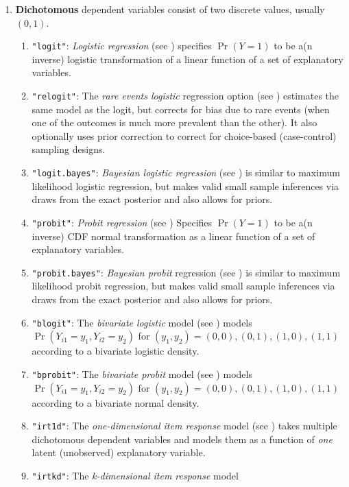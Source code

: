 \begin{enumerate}
\begin{enumerate}
   \end{enumerate}
 \item {\bf Dichotomous} dependent variables consist of two discrete
values, usually $(0,1)$.  
   \begin{enumerate}
   \item {\tt "logit"}: {\it Logistic regression} (see )
     specifies $\Pr(Y=1)$ to be a(n inverse) logistic transformation
     of a linear function of a set of explanatory variables.
   \item {\tt "relogit"}: The {\it rare events logistic} regression
     option (see ) estimates the same model as the
     logit, but corrects for bias due to rare events (when one of the
     outcomes is much more prevalent than the other).  It also
     optionally uses prior correction to correct for choice-based
     (case-control) sampling designs.
   \item {\tt "logit.bayes"}: {\it Bayesian logistic regression} (see
) is similar to maximum likelihood logistic
regression, but makes valid small sample inferences via draws from the
exact posterior and also allows for priors.  
   \item {\tt "probit"}: {\it Probit regression} (see )
     Specifies $\Pr(Y=1)$ to be a(n inverse) CDF normal transformation
     as a linear function of a set of explanatory variables.
   \item {\tt "probit.bayes"}: {\it Bayesian probit} regression (see
) is similar to maximum likelihood probit
regression, but makes valid small sample inferences via draws from the
exact posterior and also allows for priors. 
   \item {\tt "blogit"}: The {\it bivariate logistic} model (see
     ) models $\Pr(Y_{i1} = y_1, Y_{i2} = y_2)$ for
$(y_1, y_2) = {(0,0), (0,1), (1,0), (1,1)}$ according 
to a bivariate logistic density.
   \item {\tt "bprobit"}: The {\it bivariate probit} model (see
     ) models $\Pr(Y_{i1} = y_1, Y_{i2} = y_2)$ for
$(y_1, y_2) = {(0,0), (0,1), (1,0), (1,1)}$ according to a bivariate normal density.  
   \item {\tt "irt1d"}: The {\it one-dimensional item response} model
(see ) takes multiple dichotomous dependent variables and models
them as a function of \emph{one} latent (unobserved) explanatory variable.  
   \item {\tt "irtkd"}:  The {\it k-dimensional item response} model

\end{enumerate}
\end{enumerate}
